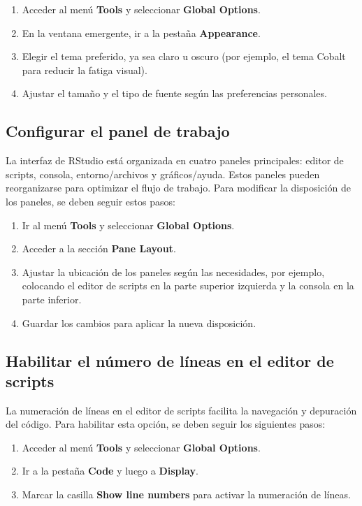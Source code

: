 \documentclass[
  spanish,
  letterpaper,
]{book}
\begin{document}
\begin{enumerate}
\def\labelenumi{\arabic{enumi}.}
\item
  Acceder al menú \textbf{Tools} y seleccionar \textbf{Global Options}.
\item
  En la ventana emergente, ir a la pestaña \textbf{Appearance}.
\item
  Elegir el tema preferido, ya sea claro u oscuro (por ejemplo, el tema
  Cobalt para reducir la fatiga visual).
\item
  Ajustar el tamaño y el tipo de fuente según las preferencias
  personales.
\end{enumerate}

\subsection{Configurar el panel de
trabajo}\label{configurar-el-panel-de-trabajo}

La interfaz de RStudio está organizada en cuatro paneles principales:
editor de scripts, consola, entorno/archivos y gráficos/ayuda. Estos
paneles pueden reorganizarse para optimizar el flujo de trabajo. Para
modificar la disposición de los paneles, se deben seguir estos pasos:

\begin{enumerate}
\def\labelenumi{\arabic{enumi}.}
\item
  Ir al menú \textbf{Tools} y seleccionar \textbf{Global Options}.
\item
  Acceder a la sección \textbf{Pane Layout}.
\item
  Ajustar la ubicación de los paneles según las necesidades, por
  ejemplo, colocando el editor de scripts en la parte superior izquierda
  y la consola en la parte inferior.
\item
  Guardar los cambios para aplicar la nueva disposición.
\end{enumerate}

\subsection{Habilitar el número de líneas en el editor de
scripts}\label{habilitar-el-nuxfamero-de-luxedneas-en-el-editor-de-scripts}

La numeración de líneas en el editor de scripts facilita la navegación y
depuración del código. Para habilitar esta opción, se deben seguir los
siguientes pasos:

\begin{enumerate}
\def\labelenumi{\arabic{enumi}.}
\item
  Acceder al menú \textbf{Tools} y seleccionar \textbf{Global Options}.
\item
  Ir a la pestaña \textbf{Code} y luego a \textbf{Display}.
\item
  Marcar la casilla \textbf{Show line numbers} para activar la
  numeración de líneas.
\end{enumerate}
\end{document}
